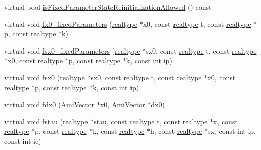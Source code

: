 \begin{DoxyCompactItemize}
\item 
virtual bool \mbox{\hyperlink{classamici_1_1_abstract_model_ad4a04e564163e190e421f4929b1f5661}{is\+Fixed\+Parameter\+State\+Reinitialization\+Allowed}} () const
\item 
virtual void \mbox{\hyperlink{classamici_1_1_abstract_model_abd57e962201af613bd4f32f4144d1c42}{fx0\+\_\+fixed\+Parameters}} (\mbox{\hyperlink{namespaceamici_a1bdce28051d6a53868f7ccbf5f2c14a3}{realtype}} $\ast$x0, const \mbox{\hyperlink{namespaceamici_a1bdce28051d6a53868f7ccbf5f2c14a3}{realtype}} t, const \mbox{\hyperlink{namespaceamici_a1bdce28051d6a53868f7ccbf5f2c14a3}{realtype}} $\ast$p, const \mbox{\hyperlink{namespaceamici_a1bdce28051d6a53868f7ccbf5f2c14a3}{realtype}} $\ast$k)
\item 
virtual void \mbox{\hyperlink{classamici_1_1_abstract_model_a17a7cc58c6f79e92fd93c31cda8c7c4f}{fsx0\+\_\+fixed\+Parameters}} (\mbox{\hyperlink{namespaceamici_a1bdce28051d6a53868f7ccbf5f2c14a3}{realtype}} $\ast$sx0, const \mbox{\hyperlink{namespaceamici_a1bdce28051d6a53868f7ccbf5f2c14a3}{realtype}} t, const \mbox{\hyperlink{namespaceamici_a1bdce28051d6a53868f7ccbf5f2c14a3}{realtype}} $\ast$x0, const \mbox{\hyperlink{namespaceamici_a1bdce28051d6a53868f7ccbf5f2c14a3}{realtype}} $\ast$p, const \mbox{\hyperlink{namespaceamici_a1bdce28051d6a53868f7ccbf5f2c14a3}{realtype}} $\ast$k, const int ip)
\item 
virtual void \mbox{\hyperlink{classamici_1_1_abstract_model_aef6c469d4925ad922a192be807585dfd}{fsx0}} (\mbox{\hyperlink{namespaceamici_a1bdce28051d6a53868f7ccbf5f2c14a3}{realtype}} $\ast$sx0, const \mbox{\hyperlink{namespaceamici_a1bdce28051d6a53868f7ccbf5f2c14a3}{realtype}} t, const \mbox{\hyperlink{namespaceamici_a1bdce28051d6a53868f7ccbf5f2c14a3}{realtype}} $\ast$x0, const \mbox{\hyperlink{namespaceamici_a1bdce28051d6a53868f7ccbf5f2c14a3}{realtype}} $\ast$p, const \mbox{\hyperlink{namespaceamici_a1bdce28051d6a53868f7ccbf5f2c14a3}{realtype}} $\ast$k, const int ip)
\item 
virtual void \mbox{\hyperlink{classamici_1_1_abstract_model_a8c3a1647a75581d9e2fc5de106d87a0d}{fdx0}} (\mbox{\hyperlink{classamici_1_1_ami_vector}{Ami\+Vector}} $\ast$x0, \mbox{\hyperlink{classamici_1_1_ami_vector}{Ami\+Vector}} $\ast$dx0)
\item 
virtual void \mbox{\hyperlink{classamici_1_1_abstract_model_ad88b646b062ed844a5c2fd4b663c2dff}{fstau}} (\mbox{\hyperlink{namespaceamici_a1bdce28051d6a53868f7ccbf5f2c14a3}{realtype}} $\ast$stau, const \mbox{\hyperlink{namespaceamici_a1bdce28051d6a53868f7ccbf5f2c14a3}{realtype}} t, const \mbox{\hyperlink{namespaceamici_a1bdce28051d6a53868f7ccbf5f2c14a3}{realtype}} $\ast$x, const \mbox{\hyperlink{namespaceamici_a1bdce28051d6a53868f7ccbf5f2c14a3}{realtype}} $\ast$p, const \mbox{\hyperlink{namespaceamici_a1bdce28051d6a53868f7ccbf5f2c14a3}{realtype}} $\ast$k, const \mbox{\hyperlink{namespaceamici_a1bdce28051d6a53868f7ccbf5f2c14a3}{realtype}} $\ast$h, const \mbox{\hyperlink{namespaceamici_a1bdce28051d6a53868f7ccbf5f2c14a3}{realtype}} $\ast$sx, const int ip, const int ie)

\end{DoxyCompactItemize}
